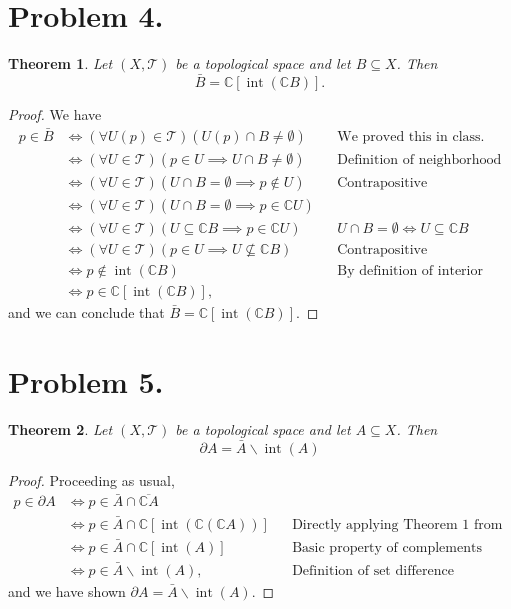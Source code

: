 \documentclass[10pt,a4paper]{article}
\author{Jeremiah Givens}
\theoremstyle{theorem}
\newtheorem{theorem}{Theorem}
\theoremstyle{definition}
\DeclareMathOperator{\interior}{int}
\newcommand{\Tau}{\mathcal{T}}
\begin{document}
\section*{Problem 4.}
\begin{theorem}
Let $(X,  \Tau)$ be a topological space and let $B \subseteq X$. Then
\begin{equation*}
\bar{B} = \mathbb{C}[\interior(\mathbb{C}B)].
\end{equation*}
\end{theorem}
\begin{proof}
We have 
\begin{align*}
p \in \bar{B} &\iff (\forall U(p) \in \Tau)(U(p) \cap B \not = \emptyset) && \text{We proved this in class.}\\
&\iff (\forall U \in \Tau)(p \in U \implies U \cap B \not = \emptyset)&& \text{Definition of neighborhood}\\
&\iff (\forall U \in \Tau)(U \cap B = \emptyset \implies p \not \in U) && \text{Contrapositive}\\
&\iff (\forall U \in \Tau)(U \cap B = \emptyset \implies p \in \mathbb{C}U)\\
&\iff (\forall U \in \Tau)(U \subseteq \mathbb{C}B \implies p \in \mathbb{C}U)&& U \cap B = \emptyset \iff U \subseteq \mathbb{C}B \\
&\iff (\forall U \in \Tau)(p \in U \implies U \not \subseteq \mathbb{C} B)&& \text{Contrapositive}\\
&\iff p \not \in \interior(\mathbb{C}B) && \text{By definition of interior}\\
&\iff p \in \mathbb{C}[\interior(\mathbb{C}B)] \text{,}
\end{align*}
and we can conclude that $\bar{B} = \mathbb{C}[\interior(\mathbb{C}B)]$.
\end{proof}

\section*{Problem 5.}
\begin{theorem}
Let $(X,  \Tau)$ be a topological space and let $A \subseteq X$. Then
\begin{equation*}
\partial A = \bar{A} \backslash \interior(A)
\end{equation*}
\end{theorem}

\begin{proof}
Proceeding as usual,
\begin{align*}
p \in \partial A &\iff p \in \bar{A} \cap \overline{\mathbb{C}A}\\
&\iff p \in \bar{A} \cap \mathbb{C}[\interior(\mathbb{C}(\mathbb{C}A))] &&\text{Directly applying Theorem 1 from Problem 4}\\
&\iff p \in \bar{A} \cap \mathbb{C}[\interior(A)] && \text{Basic property of complements}\\
&\iff p \in \bar{A} \backslash \interior(A)\text{,} && \text{Definition of set difference}
\end{align*}
and we have shown $\partial A = \bar{A} \backslash \interior(A)$.
\end{proof}
\end{document}
